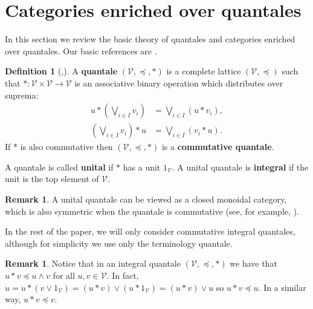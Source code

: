 \documentclass[11pt,a4paper]{amsart}
\theoremstyle{definition}
\newtheorem{definition}[theorem]{Definition}
\newtheorem{remark}[theorem]{Remark}
\begin{document}
	
	
	
	
	\section{Categories enriched over quantales}\label{sec:vcat}
	
	In this section we review the basic theory of quantales and categories enriched over quantales. Our basic references are \cite{BookMonoidalTopology,BookQuantales}.
	
	
	\begin{definition}[\mbox{\cite[Section II.1.10]{BookMonoidalTopology},\cite[Section 2.3]{BookQuantales}}]
		A \textbf{quantale} $(\mathscr{V},\preceq,\ast)$ is a complete lattice $(\mathscr{V},\preceq)$ such that $\ast:\mathscr{V}\times \mathscr{V}\to \mathscr{V}$ is an associative binary operation which distributes over suprema:
		\begin{align*}
			u\ast \left(\bigvee_{i\in I} v_i\right)&=\bigvee_{i\in I}(u\ast v_i),\\
			\left(\bigvee_{i\in I} v_i\right)\ast u&=\bigvee_{i\in I}(v_i\ast u).
		\end{align*}
		If $\ast$ is also commutative then $(\mathscr{V},\preceq,\ast)$ is a \textbf{commutative quantale}.
		
		A quantale is called \textbf{unital} if $\ast$ has a unit $1_\mathscr{V}.$ A unital quantale is \textbf{integral} if the unit is the top element of $\mathscr{V}.$
		
	\end{definition}
	
	
	\begin{remark}
		A unital quantale can be viewed as a closed monoidal ca\-tegory, which is also symmetric when the quantale is commutative (see, for example, \cite{BookMonoidalTopology}).
	\end{remark}
	
	
	
	In the rest of the paper, we will only consider commutative integral quantales, although for simplicity we use only the terminology quantale.
	
	\begin{remark}
		Notice that in an integral quantale $(\mathscr{V},\preceq,\ast)$ we have that $u\ast v\preceq u\wedge v$ for all $u,v\in \mathscr{V}.$ In fact, $u=u\ast (v\vee 1_\mathscr{V})=(u\ast v)\vee (u\ast 1_\mathscr{V})=(u\ast v)\vee u$ so $u\ast v\preceq u.$ In a similar way, $u\ast v\preceq v.$
	\end{remark}
	
\end{document}
